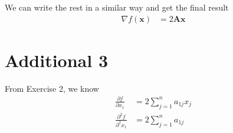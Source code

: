 \documentclass{article}
\newcommand{\vect}[1]{\boldsymbol{#1}}
\begin{document}
We can write the rest in a similar way and get the final result
\begin{align*}
  \nabla f(\vect{x}) &= 2 \vect A \vect x
\end{align*}
\newpage
\section*{Additional 3}
From Exercise 2, we know \begin{align*}
  \frac{\partial f}{\partial x_1} &= 2 \sum_{j=1}^n a_{1j}x_j \\
  \frac{\partial^2 f}{\partial^2 x_1} &= 2 \sum_{j=1}^n a_{1j} \\
\end{align*}
\end{document}
